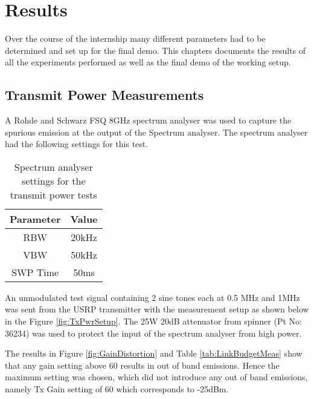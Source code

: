 \chapter{Results}
\label{ch:results}

Over the course of the internship many different parameters had to be determined and set up for the final demo. This chapters documents the results of all the experiments performed as well as the final demo of the working setup.

\section{Transmit Power Measurements}\label{GainDistortion}

A Rohde and Schwarz FSQ 8GHz spectrum analyser was used to capture the spurious emission at the output of the Spectrum analyser. The spectrum analyser had the following settings for this test.

\begin{table}[H]
    \begin{center}
        \begin{tabular}{|c|c|}
            \hline
            Parameter & Value \\ \hline
            RBW & 20kHz \\ \hline
            VBW & 50kHz \\ \hline
            SWP Time & 50ms  \\ 
            \hline
        \end{tabular}
    \end{center}
    \caption{Spectrum analyser settings for the transmit power tests}
    \label{}
\end{table}

An unmodulated test signal containing 2 sine tones each at 0.5 MHz and 1MHz was sent from the USRP transmitter with the measurement setup as shown below in the Figure \ref{fig:TxPwrSetup}. The 25W 20dB attenuator from spinner (Pt No: 36234) was used to protect the input of the spectrum analyser from high power.


The results in Figure \ref{fig:GainDistortion} and Table \ref{tab:LinkBudgetMeas} show that any gain setting above 60 results in out of band emissions. Hence the maximum setting was chosen, which did not introduce any out of band emissions, namely Tx Gain setting of 60 which corresponds to -25dBm.

